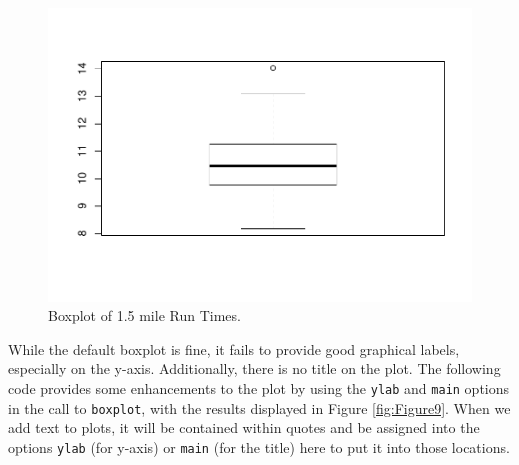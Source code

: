 \documentclass[]{book}
\newenvironment{Shaded}{\begin{snugshade}}{\end{snugshade}}
\newcommand{\KeywordTok}[1]{\textcolor[rgb]{0.13,0.29,0.53}{\textbf{#1}}}
\newcommand{\DataTypeTok}[1]{\textcolor[rgb]{0.13,0.29,0.53}{#1}}
\newcommand{\StringTok}[1]{\textcolor[rgb]{0.31,0.60,0.02}{#1}}
\newcommand{\OperatorTok}[1]{\textcolor[rgb]{0.81,0.36,0.00}{\textbf{#1}}}
\newcommand{\NormalTok}[1]{#1}
\begin{document}
\begin{Shaded}
\end{Shaded}

\begin{figure}
\centering
\includegraphics{GreenwoodBanner_files/figure-latex/Figure8-1.pdf}
\caption{\label{fig:Figure8}Boxplot of 1.5 mile Run Times.}
\end{figure}

While the default boxplot is fine, it fails to provide good graphical
labels, especially on the y-axis. Additionally, there is no title on the
plot. The following code provides some enhancements to the plot by using
the \texttt{ylab} and \texttt{main} options in the call to
\texttt{boxplot}, with the results displayed in Figure
\ref{fig:Figure9}. When we add text to plots, it will be contained
within quotes and be assigned into the options \texttt{ylab} (for
y-axis) or \texttt{main} (for the title) here to put it into those
locations.



\begin{Shaded}
\end{Shaded}
\end{document}
